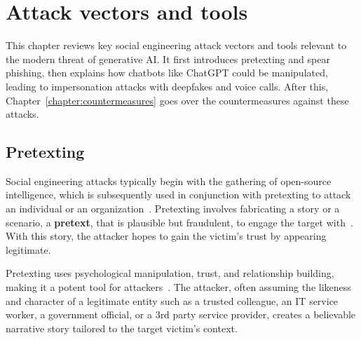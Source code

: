 \chapter{Attack vectors and tools\label{chapter:attacks}}
\begin{comment}
\end{comment}

This chapter reviews key social engineering attack vectors and tools relevant to the modern threat of generative AI. It first introduces pretexting and spear phishing, then explains how chatbots like ChatGPT could be manipulated, leading to impersonation attacks with deepfakes and voice calls. After this, Chapter~\ref{chapter:countermeasures} goes over the countermeasures against these attacks.



\section{Pretexting}
\begin{comment}
\end{comment}

%
%
Social engineering attacks typically begin with the gathering of open-source intelligence, which is subsequently used in conjunction with pretexting to attack an individual or an organization~\citep{hadnagy_Social_Engineering_The_Science_2018}. Pretexting involves fabricating a story or a scenario, a \textbf{pretext}, that is plausible but fraudulent, to engage the target with~\citep{wang_Defining_Social_Engineering_2020}. With this story, the attacker hopes to gain the victim's trust by appearing legitimate. 

%
%
Pretexting uses psychological manipulation, trust, and relationship building, making it a potent tool for attackers~\citep{mitnick_The_Art_of_Deception_2003}. The attacker, often assuming the likeness and character of a legitimate entity such as a trusted colleague, an IT service worker, a government official, or a 3rd party service provider, creates a believable narrative story tailored to the target victim's context.

%
%







